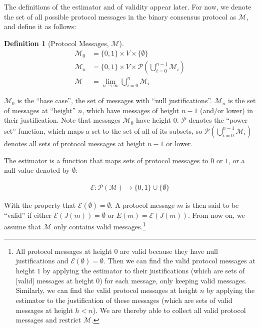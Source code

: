 \documentclass{article}
\theoremstyle{definition}
\newtheorem{defn}{Definition}[section]
\begin{document}
The definitions of the estimator and of validity appear later. For now, we denote the set of all possible protocol messages in the binary consensus protocol as $\mathcal{M}$, and define it as follows:

\begin{defn}[Protocol Messages, $\mathcal{M}$]
\begin{equation*}
\begin{split}
    \mathcal{M}_0 &= \{0, 1\} \times V \times \{\emptyset\}\\
    \mathcal{M}_n &= \{0, 1\} \times V \times \mathcal{P}(\bigcup_{i=0}^{n-1} \mathcal{M}_i)\\
    \mathcal{M} &= \lim_{n \to \infty} \bigcup_{i=0}^{n} \mathcal{M}_i
\end{split}
\end{equation*}
\end{defn}

$\mathcal{M}_0$ is the ``base case'', the set of messages with ``null justifications''. $\mathcal{M}_n$ is the set of messages at ``height'' $n$, which have messages of height $n-1$ (and/or lower) in their justification. Note that messages $\mathcal{M}_0$ have height $0$. $\mathcal{P}$ denotes the ``power set'' function, which maps a set to the set of all of its subsets, so $\mathcal{P}(\bigcup_{i=0}^{n-1} \mathcal{M}_i)$ denotes all sets of protocol messages at height $n-1$ or lower.

The estimator is a function that maps sets of protocol messages to $0$ or $1$, or a null value denoted by $\emptyset$:

\begin{equation*}
\begin{split}
    \mathcal{E}:\mathcal{P}(\mathcal{M}) \to \{0, 1\} \cup \{\emptyset\}
\end{split}
\end{equation*}

With the property that $\mathcal{E}(\emptyset) = \emptyset$. A protocol message $m$ is then said to be ``valid'' if either $\mathcal{E}(J(m)) = \emptyset$ or $E(m) = \mathcal{E}(J(m))$. From now on, we assume that $\mathcal{M}$ only contains valid messages.\footnote{All protocol messages at height $0$ are valid because they have null justifications and $\mathcal{E}(\emptyset) = \emptyset$. Then we can find the valid protocol messages at height $1$ by applying the estimator to their justifications (which are sets of [valid] messages at height 0) for each message, only keeping valid messages. Similarly, we can find the valid protocol messages at height $n$ by applying the estimator to the justification of these messages (which are sets of valid messages at height $h < n$). We are thereby able to collect all valid protocol messages and restrict $\mathcal{M}.$}
\end{document}
